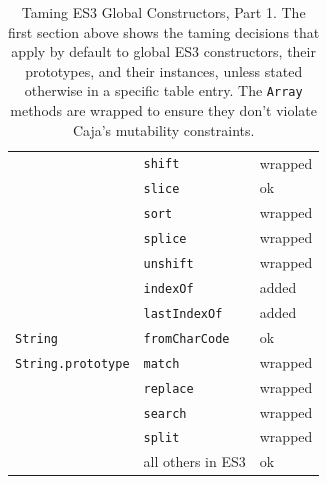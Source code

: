 \documentclass[letterpaper,twocolumn,10pt]{article}
\newcommand{\code}[1]{{\tt {#1}}}              %
\begin{document}
\begin{table}
\begin{tabular}{lll}
                                 & \code{shift}                & wrapped \\
                                 & \code{slice}                & ok \\
                                 & \code{sort}                 & wrapped \\
                                 & \code{splice}               & wrapped \\
                                 & \code{unshift}              & wrapped \\
                                 & \code{indexOf}              & added \\
                                 & \code{lastIndexOf}          & added \\
  \hline
  \code{String}                  & \code{fromCharCode}         & ok \\
  \code{String.prototype}        & \code{match}                & wrapped \\
                                 & \code{replace}              & wrapped \\
                                 & \code{search}               & wrapped \\
                                 & \code{split}                & wrapped \\
                                 &           all others in ES3 & ok \\
\end{tabular}

\caption[Taming ES3 Global Constructors, Part 1.]{Taming ES3 Global
Constructors, Part 1. The first section above shows the taming
decisions that apply by default to global ES3 constructors, their prototypes,
and their instances, unless stated otherwise in a specific table entry. The
\code{Array} methods are wrapped to ensure they don't violate Caja's
mutability constraints.}
\label{tab:taming-es3-1}
\end{table}
\end{document}
